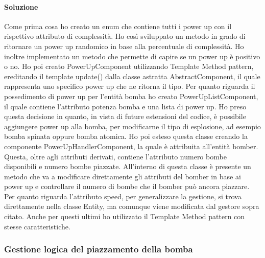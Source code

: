 \documentclass[a4paper,12pt]{report}
\begin{document}
\paragraph{Soluzione} Come prima cosa ho creato un enum che contiene tutti i power up con il rispettivo attributo di complessità. Ho così sviluppato un metodo in grado di ritornare un power up randomico in base alla percentuale di complessità. Ho inoltre implementato un metodo che permette di capire se un power up è positivo o no.
Ho poi creato PowerUpComponent utilizzando Template Method pattern, ereditando  il template update() dalla classe astratta AbstractComponent, il quale rappresenta uno specifico power up che ne ritorna il tipo.
Per quanto riguarda il possedimento di power up per l’entità bomba ho creato PowerUpListComponent, il quale contiene l’attributo potenza bomba e una lista di power up. Ho preso questa decisione in quanto, in vista di future estensioni del codice, è possibile aggiungere power up alla bomba, per modificarne il tipo di esplosione, ad esempio bomba spinata oppure bomba atomica.
Ho poi esteso questa classe creando la componente PowerUpHandlerComponent, la quale è attribuita all’entità bomber. Questa, oltre agli attributi derivati, contiene l’attributo numero bombe disponibili e numero bombe piazzate. All’interno di questa classe è presente un metodo che va a modificare direttamente gli attributi del bomber in base ai power up e controllare il numero di bombe che il bomber può ancora piazzare.
Per quanto riguarda l’attributo speed, per generalizzare la gestione, si trova direttamente nella classe Entity, ma comunque viene modificata dal gestore sopra citato. Anche per questi ultimi ho utilizzato il Template Method pattern con stesse caratteristiche.


\subsubsection{Gestione logica del piazzamento della bomba}
\end{document}
